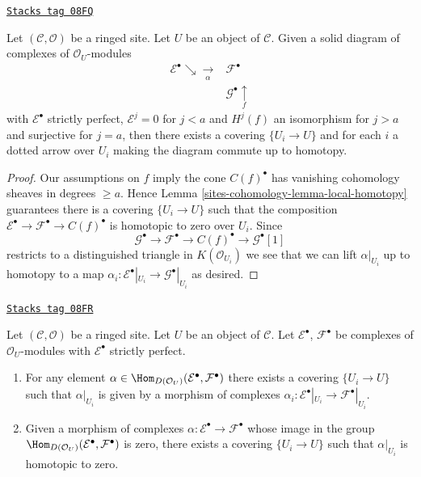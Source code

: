 \begin{lemma}
\label{sites-cohomology-lemma-lift-through-quasi-isomorphism}
\href{https://stacks.math.columbia.edu/tag/08FQ}{\texttt{Stacks tag 08FQ}}

Let $(\mathcal{C}, \mathcal{O})$ be a ringed site. Let $U$ be an object of
$\mathcal{C}$. Given a solid diagram of complexes of $\mathcal{O}_U$-modules
$$
\begin{array}{cc}\mathcal{E}^\bullet \searrow\underset{\alpha}{\longrightarrow} & \mathcal{F}^\bullet \\  & \mathcal{G}^\bullet \underset{f}{\uparrow}\end{array}
$$
with $\mathcal{E}^\bullet$ strictly perfect, $\mathcal{E}^j = 0$ for
$j < a$ and $H^j(f)$ an isomorphism for $j > a$ and surjective for
$j = a$, then there exists a covering $\{U_i \to U\}$ and for each $i$
a dotted arrow over $U_i$ making the diagram commute up to homotopy.
\end{lemma}

\begin{proof}
Our assumptions on $f$ imply the cone $C(f)^\bullet$ has vanishing
cohomology sheaves in degrees $\geq a$.
Hence Lemma \ref{sites-cohomology-lemma-local-homotopy} guarantees there is a
covering $\{U_i \to U\}$ such that the composition
$\mathcal{E}^\bullet \to \mathcal{F}^\bullet \to C(f)^\bullet$
is homotopic to zero over $U_i$. Since
$$
\mathcal{G}^\bullet \to \mathcal{F}^\bullet \to C(f)^\bullet \to
\mathcal{G}^\bullet[1]
$$
restricts to a distinguished triangle in $K(\mathcal{O}_{U_i})$
we see that we can lift $\alpha|_{U_i}$ up to homotopy to a map
$\alpha_i : \mathcal{E}^\bullet|_{U_i} \to \mathcal{G}^\bullet|_{U_i}$
as desired.
\end{proof}

\begin{lemma}
\label{sites-cohomology-lemma-local-actual}
\href{https://stacks.math.columbia.edu/tag/08FR}{\texttt{Stacks tag 08FR}}

Let $(\mathcal{C}, \mathcal{O})$ be a ringed site. Let $U$ be an object
of $\mathcal{C}$. Let $\mathcal{E}^\bullet$, $\mathcal{F}^\bullet$ be
complexes of $\mathcal{O}_U$-modules with $\mathcal{E}^\bullet$ strictly
perfect.
\begin{enumerate}
\item For any element
$\alpha \in \Hom_{D(\mathcal{O}_U)}(\mathcal{E}^\bullet, \mathcal{F}^\bullet)$
there exists a covering $\{U_i \to U\}$ such that
$\alpha|_{U_i}$ is given by a morphism of complexes
$\alpha_i : \mathcal{E}^\bullet|_{U_i} \to \mathcal{F}^\bullet|_{U_i}$.
\item Given a morphism of complexes
$\alpha : \mathcal{E}^\bullet \to \mathcal{F}^\bullet$
whose image in the group
$\Hom_{D(\mathcal{O}_U)}(\mathcal{E}^\bullet, \mathcal{F}^\bullet)$
is zero, there exists a covering $\{U_i \to U\}$ such that
$\alpha|_{U_i}$ is homotopic to zero.
\end{enumerate}
\end{lemma}

